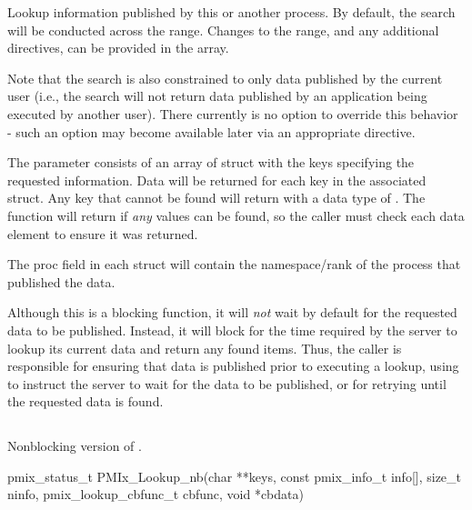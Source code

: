 Lookup information published by this or another process.
By default, the search will be conducted across the  range.
Changes to the range, and any additional directives, can be provided in the  array.

Note that the search is also constrained to only data published by the current user (i.e., the search will not return data published by an application being executed by another user).
There currently is no option to override this behavior - such an option may become available later via an appropriate  directive.

The  parameter consists of an array of  struct with the keys specifying the requested information.
Data will be returned for each key in the associated  struct.
Any key that cannot be found will return with a data type of .
The function will return  if \emph{any} values can be found, so the caller must check each data element to ensure it was returned.

The proc field in each  struct will contain the namespace/rank of the process that published the data.

\adviceuserstart
Although this is a blocking function, it will \emph{not} wait by default for the requested data to be published.
Instead, it will block for the time required by the server to lookup its current data and return any found items.
Thus, the caller is responsible for ensuring that data is published prior to executing a lookup, using  to instruct the server to wait for the data to be published, or for retrying until the requested data is found.
\adviceuserend

\subsection{}

\summary

Nonblocking version of .

\format

\cspecificstart
\begin{codepar}
pmix_status_t
PMIx_Lookup_nb(char **keys,
               const pmix_info_t info[], size_t ninfo,
               pmix_lookup_cbfunc_t cbfunc, void *cbdata)
\end{codepar}
\cspecificend

